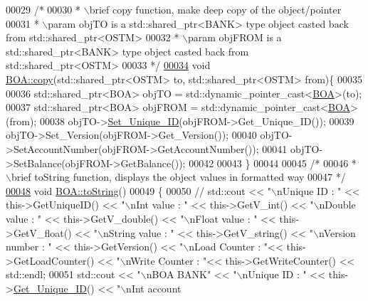 \begin{DoxyCode}
00029 \textcolor{comment}{/*}
00030 \textcolor{comment}{ * \(\backslash\)brief copy function, make deep copy of the object/pointer}
00031 \textcolor{comment}{ * \(\backslash\)param objTO is a std::shared\_ptr<BANK> type object casted back from std::shared\_ptr<OSTM>}
00032 \textcolor{comment}{ * \(\backslash\)param objFROM is a std::shared\_ptr<BANK> type object casted back from std::shared\_ptr<OSTM>}
00033 \textcolor{comment}{ */}
\hypertarget{_b_o_a_8cpp_source.tex_l00034}{}\hyperlink{class_b_o_a_a54fbcabb55b22fb72f45986768974403_a54fbcabb55b22fb72f45986768974403}{00034} \textcolor{keywordtype}{void} \hyperlink{class_b_o_a_a54fbcabb55b22fb72f45986768974403_a54fbcabb55b22fb72f45986768974403}{BOA::copy}(std::shared\_ptr<OSTM> to, std::shared\_ptr<OSTM> from)\{
00035 
00036     std::shared\_ptr<BOA> objTO = std::dynamic\_pointer\_cast<\hyperlink{class_b_o_a}{BOA}>(to);
00037     std::shared\_ptr<BOA> objFROM = std::dynamic\_pointer\_cast<\hyperlink{class_b_o_a}{BOA}>(from);
00038     objTO->\hyperlink{class_o_s_t_m_ab5019a32185631c08abbf826422f2d93_ab5019a32185631c08abbf826422f2d93}{Set\_Unique\_ID}(objFROM->Get\_Unique\_ID());
00039     objTO->Set\_Version(objFROM->Get\_Version());
00040     objTO->SetAccountNumber(objFROM->GetAccountNumber());
00041     objTO->SetBalance(objFROM->GetBalance());
00042         
00043 \}
00044 
00045 \textcolor{comment}{/*}
00046 \textcolor{comment}{ *  \(\backslash\)brief toString function, displays the object values in formatted way}
00047 \textcolor{comment}{ */}
\hypertarget{_b_o_a_8cpp_source.tex_l00048}{}\hyperlink{class_b_o_a_a348df0299997f81bcad0ec034dab0b8d_a348df0299997f81bcad0ec034dab0b8d}{00048} \textcolor{keywordtype}{void} \hyperlink{class_b_o_a_a348df0299997f81bcad0ec034dab0b8d_a348df0299997f81bcad0ec034dab0b8d}{BOA::toString}()
00049 \{
00050    \textcolor{comment}{// std::cout << "\(\backslash\)nUnique ID : " << this->GetUniqueID() << "\(\backslash\)nInt value : " << this->GetV\_int() <<
       "\(\backslash\)nDouble value : " << this->GetV\_double() << "\(\backslash\)nFloat value : " << this->GetV\_float() << "\(\backslash\)nString value : " <<
       this->GetV\_string()  << "\(\backslash\)nVersion number : " << this->GetVersion() << "\(\backslash\)nLoad Counter : "<<
       this->GetLoadCounter() << "\(\backslash\)nWrite Counter : "<< this->GetWriteCounter() << std::endl;}
00051      std::cout << \textcolor{stringliteral}{"\(\backslash\)nBOA BANK"} << \textcolor{stringliteral}{"\(\backslash\)nUnique ID : "} << this->\hyperlink{class_o_s_t_m_a5a01a8b98d16b1d1904ecf9356e7b71d_a5a01a8b98d16b1d1904ecf9356e7b71d}{Get\_Unique\_ID}() << \textcolor{stringliteral}{"\(\backslash\)nInt account
}
\end{DoxyCode}
